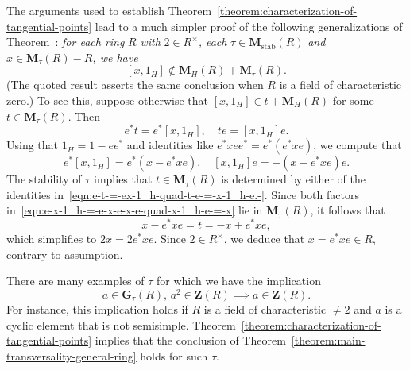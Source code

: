 \documentclass[reqno]{amsart}
\DeclareMathOperator{\stab}{stab}
\theoremstyle{plain} \newtheorem{theorem} {Theorem} \newtheorem{conjecture} {Conjecture} \newtheorem{corollary} [theorem] {Corollary} \newtheorem{proposition} [theorem] {Proposition} \newtheorem{fact} [theorem] {Fact}
\theoremstyle{definition} \newtheorem{definition} [theorem] {Definition}
\theoremstyle{itplain} %
\begin{document}
\begin{remark}\label{Remark:recoverLiealgproof}
  The arguments used to establish Theorem~\ref{theorem:characterization-of-tangential-points} lead to a much simpler proof of the following generalizations of Theorem~\cite[Theorem 16.3]{2020arXiv201202187N}: \emph{for each ring} $R$ \emph{with} $2 \in R^\times$\emph{, each} $\tau \in \mathbf{M}_{\stab}(R)$ \emph{and} $x \in \mathbf{M}_\tau(R) - R$\emph{, we have}
  \begin{equation}\label{eqn:x-1_h-notin-mathbfm_hr-+-mathbfm_taur.-} [x,1_H] \notin \mathbf{M}_{H}(R) + \mathbf{M}_{\tau}(R).
  \end{equation}
  (The quoted result asserts the same conclusion when $R$ is a field of characteristic zero.)  To see this, suppose otherwise that $[x,1_H] \in t + \mathbf{M}_H(R)$ for some $t \in \mathbf{M}_\tau(R)$.  Then
  \begin{equation}\label{eqn:e-t-=-ex-1_h-quad-t-e-=-x-1_h-e.-}
    e^* t = e^*[x,1_H], \quad t e = [x,1_H] e.
  \end{equation}
  Using that $1_H = 1 - e e^*$ and identities like $e^* x e e^* = e^* (e^* x e)$, we compute that
  \begin{equation}\label{eqn:e-x-1_h-=-e-x-e-x-e-quad-x-1_h-e-=-x}
    e^* [x,1_H] = e^* (x - e^* x e), \quad [x,1_H] e = - (x - e^* x e) e.
  \end{equation}
  The stability of $\tau$ implies that $t \in \mathbf{M}_{\tau}(R)$ is determined by either of the identities in~\eqref{eqn:e-t-=-ex-1_h-quad-t-e-=-x-1_h-e.-}.  Since both factors in~\eqref{eqn:e-x-1_h-=-e-x-e-x-e-quad-x-1_h-e-=-x} lie in $\mathbf{M}_{\tau}(R)$, it follows that
  \begin{equation*}
    x - e^* x e = t = - x + e^* x e,
  \end{equation*}
  which simplifies to $2 x = 2 e^* x e$.  Since $2 \in R^\times$, we deduce that $x = e^* x e \in R$, contrary to assumption.
\end{remark}

\begin{remark}
  There are many examples of $\tau$ for which we have the implication
  \begin{equation*}
    a \in \mathbf{G}_\tau(R),
    \,
    a^2 \in \mathbf{Z}(R) \implies a \in \mathbf{Z}(R).
  \end{equation*}
  For instance, this implication holds if $R$ is a field of characteristic $\neq 2$ and $a$ is a cyclic element that is not semisimple.  Theorem~\ref{theorem:characterization-of-tangential-points} implies that the conclusion of Theorem~\ref{theorem:main-transversality-general-ring} holds for such $\tau$.  
\end{remark}
\end{document}
